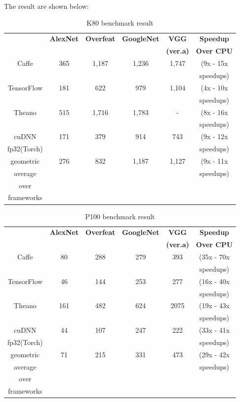 \documentclass[conference]{IEEEtran}
\begin{document}
The result are shown below:
\begin{table}[H]
\caption{K80 benchmark result}
\begin{center}
\begin{tabular}{|c|c|c|c|c|c|}
\hline
 & \textbf{AlexNet}& \textbf{Overfeat}& \textbf{GoogleNet} & \textbf{VGG} & \textbf{Speedup}\\
 &&&& \textbf{(ver.a)} & \textbf{Over CPU}\\
\hline
Caffe & 365& 1,187 & 1,236 & 1,747 & (9x - 15x\\
&&&&& speedups)\\
\hline
TensorFlow & 181& 622 & 979 & 1,104 & (4x - 10x\\
&&&&& speedups)\\
\hline
Theano & 515& 1,716 & 1,783 & - & (8x - 16x\\
&&&&& speedups)\\
\hline
cuDNN & 171& 379 & 914 & 743 & (9x - 12x\\
fp32(Torch)&&&&& speedups)\\
\hline
geometric & 276& 832 & 1,187 & 1,127 & (9x - 11x\\
average&&&&& speedups)\\
over&&&&&\\
frameworks&&&&&\\
\hline
\end{tabular}
\label{tab4}
\end{center}
\end{table}

\begin{table}[H]
\caption{P100 benchmark result}
\begin{center}
\begin{tabular}{|c|c|c|c|c|c|}
\hline
 & \textbf{AlexNet}& \textbf{Overfeat}& \textbf{GoogleNet} & \textbf{VGG} & \textbf{Speedup}\\
 &&&& \textbf{(ver.a)} & \textbf{Over CPU}\\
\hline
Caffe & 80& 288 & 279 & 393 & (35x - 70x\\
&&&&& speedups)\\
\hline
TensorFlow & 46& 144 & 253 & 277 & (16x - 40x\\
&&&&& speedups)\\
\hline
Theano & 161& 482 & 624 & 2075 & (19x - 43x\\
&&&&& speedups)\\
\hline
cuDNN & 44& 107 & 247 & 222 & (33x - 41x\\
fp32(Torch)&&&&& speedups)\\
\hline
geometric & 71& 215 & 331 & 473 & (29x - 42x\\
average&&&&& speedups)\\
over&&&&&\\
frameworks&&&&&\\
\hline
\end{tabular}
\label{tab4}
\end{center}
\end{table}
\end{document}
